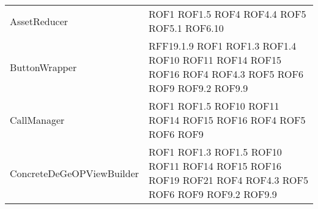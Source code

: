 \begin{longtable}{p{5cm}!{\VRule[1pt]}p{2.5cm}}
		AssetReducer & ROF1 \newline ROF1.5 \newline ROF4 \newline ROF4.4 \newline ROF5 \newline ROF5.1 \newline ROF6.10\\
		ButtonWrapper & RFF19.1.9 \newline ROF1 \newline ROF1.3 \newline ROF1.4 \newline ROF10 \newline ROF11 \newline ROF14 \newline ROF15 \newline ROF16 \newline ROF4 \newline ROF4.3 \newline ROF5 \newline ROF6 \newline ROF9 \newline ROF9.2 \newline ROF9.9\\
		CallManager & ROF1 \newline ROF1.5 \newline ROF10 \newline ROF11 \newline ROF14 \newline ROF15 \newline ROF16 \newline ROF4 \newline ROF5 \newline ROF6 \newline ROF9\\
		ConcreteDeGeOPViewBuilder & ROF1 \newline ROF1.3 \newline ROF1.5 \newline ROF10 \newline ROF11 \newline ROF14 \newline ROF15 \newline ROF16 \newline ROF19 \newline ROF21 \newline ROF4 \newline ROF4.3 \newline ROF5 \newline ROF6 \newline ROF9 \newline ROF9.2 \newline ROF9.9\\

\end{longtable}
